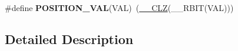 \begin{DoxyCompactItemize}
\item 
\hypertarget{group___exported__macros_ga47a8870d71d55cefb3df47cd8c815ec8}{\#define {\bfseries P\-O\-S\-I\-T\-I\-O\-N\-\_\-\-V\-A\-L}(V\-A\-L)~(\hyperlink{group___c_m_s_i_s___core___instruction_interface_ga5d5bb1527e042be4a9fa5a33f65cc248}{\-\_\-\-\_\-\-C\-L\-Z}(\-\_\-\-\_\-\-R\-B\-I\-T(V\-A\-L)))}\label{group___exported__macros_ga47a8870d71d55cefb3df47cd8c815ec8}

\end{DoxyCompactItemize}


\subsection{Detailed Description}
